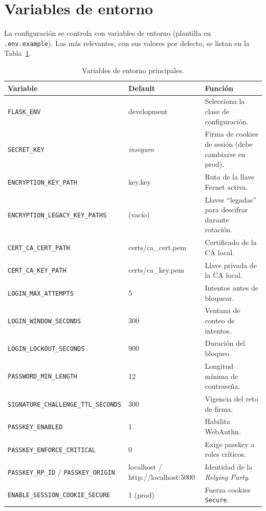 \documentclass[10pt,letterpaper]{report}
\begin{document}
\section{Variables de entorno}
La configuraci\'on se controla con variables de entorno (plantilla en \texttt{.env.example}). Las m\'as
relevantes, con sus valores por defecto, se listan en la Tabla~\ref{tab:env}.

\begin{table}[h]
\centering
\renewcommand{\arraystretch}{1.2}
\begin{tabularx}{\textwidth}{l l X}
\toprule
\textbf{Variable} & \textbf{Default} & \textbf{Funci\'on} \\
\midrule
\texttt{FLASK\_ENV} & development & Selecciona la clase de configuraci\'on. \\
\texttt{SECRET\_KEY} & \itshape inseguro & Firma de cookies de sesi\'on (debe cambiarse en prod). \\
\texttt{ENCRYPTION\_KEY\_PATH} & key.key & Ruta de la llave Fernet activa. \\
\texttt{ENCRYPTION\_LEGACY\_KEY\_PATHS} & (vac\'io) & Llaves ``legadas'' para descifrar durante rotaci\'on. \\
\texttt{CERT\_CA\_CERT\_PATH} & certs/ca\_cert.pem & Certificado de la CA local. \\
\texttt{CERT\_CA\_KEY\_PATH} & certs/ca\_key.pem & Llave privada de la CA local. \\
\texttt{LOGIN\_MAX\_ATTEMPTS} & 5 & Intentos antes de bloquear. \\
\texttt{LOGIN\_WINDOW\_SECONDS} & 300 & Ventana de conteo de intentos. \\
\texttt{LOGIN\_LOCKOUT\_SECONDS} & 900 & Duraci\'on del bloqueo. \\
\texttt{PASSWORD\_MIN\_LENGTH} & 12 & Longitud m\'inima de contrase\~na. \\
\texttt{SIGNATURE\_CHALLENGE\_TTL\_SECONDS} & 300 & Vigencia del reto de firma. \\
\texttt{PASSKEY\_ENABLED} & 1 & Habilita WebAuthn. \\
\texttt{PASSKEY\_ENFORCE\_CRITICAL} & 0 & Exige passkey a roles cr\'iticos. \\
\texttt{PASSKEY\_RP\_ID} / \texttt{PASSKEY\_ORIGIN} & localhost / http://localhost:5000 & Identidad de la \emph{Relying Party}. \\
\texttt{ENABLE\_SESSION\_COOKIE\_SECURE} & 1 (prod) & Fuerza cookies \texttt{Secure}. \\
\bottomrule
\end{tabularx}
\caption{Variables de entorno principales.}
\label{tab:env}
\end{table}
\end{document}
